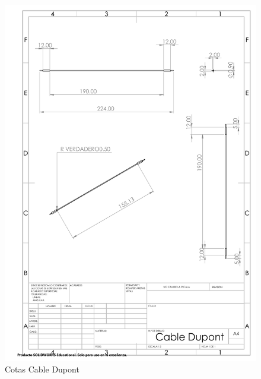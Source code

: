  \begin{figure}[H]
        \centering
        \includegraphics[trim = {0mm 0mm 0mm 0mm},clip,scale=0.2]{10/Img/cotasDupont.pdf}
        \caption{Cotas Cable Dupont}
        \label{Cables}
    \end{figure}
    
